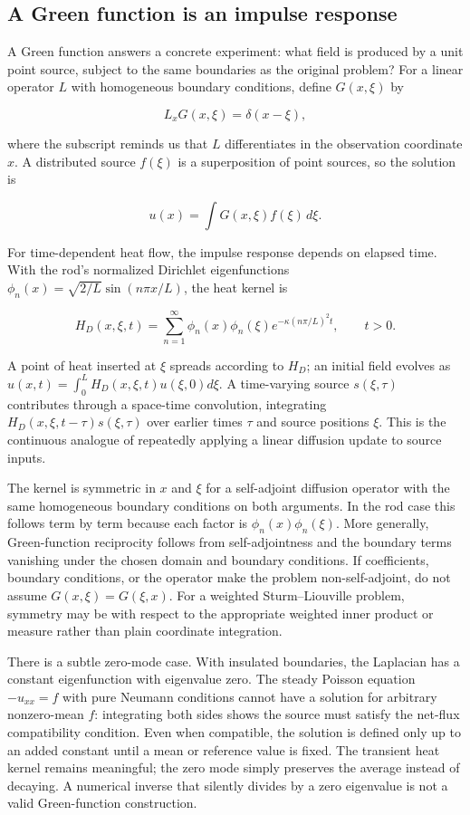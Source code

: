 \subsection{A Green function is an impulse response}\label{02-foundations-ii-ch025-a-green-function-is-an-impulse-response}

A Green function answers a concrete experiment: what field is produced by a unit point source, subject to the same boundaries as the original problem? For a linear operator \(L\) with homogeneous boundary conditions, define \(G(x,\xi)\) by

\[
L_xG(x,\xi)=\delta(x-\xi),
\]

where the subscript reminds us that \(L\) differentiates in the observation coordinate \(x\). A distributed source \(f(\xi)\) is a superposition of point sources, so the solution is

\[
u(x)=\int G(x,\xi)f(\xi)\,d\xi.
\]

For time-dependent heat flow, the impulse response depends on elapsed time. With the rod's normalized Dirichlet eigenfunctions \(\phi_n(x)=\sqrt{2/L}\sin(n\pi x/L)\), the heat kernel is

\[
H_D(x,\xi,t)=\sum_{n=1}^{\infty}\phi_n(x)\phi_n(\xi)e^{-\kappa(n\pi/L)^2t},\qquad t>0.
\]

A point of heat inserted at \(\xi\) spreads according to \(H_D\); an initial field evolves as \(u(x,t)=\int_0^LH_D(x,\xi,t)u(\xi,0)d\xi\). A time-varying source \(s(\xi,\tau)\) contributes through a space-time convolution, integrating \(H_D(x,\xi,t-\tau)s(\xi,\tau)\) over earlier times \(\tau\) and source positions \(\xi\). This is the continuous analogue of repeatedly applying a linear diffusion update to source inputs.

The kernel is symmetric in \(x\) and \(\xi\) for a self-adjoint diffusion operator with the same homogeneous boundary conditions on both arguments. In the rod case this follows term by term because each factor is \(\phi_n(x)\phi_n(\xi)\). More generally, Green-function reciprocity follows from self-adjointness and the boundary terms vanishing under the chosen domain and boundary conditions. If coefficients, boundary conditions, or the operator make the problem non-self-adjoint, do not assume \(G(x,\xi)=G(\xi,x)\). For a weighted Sturm--Liouville problem, symmetry may be with respect to the appropriate weighted inner product or measure rather than plain coordinate integration.

There is a subtle zero-mode case. With insulated boundaries, the Laplacian has a constant eigenfunction with eigenvalue zero. The steady Poisson equation \(-u_{xx}=f\) with pure Neumann conditions cannot have a solution for arbitrary nonzero-mean \(f\): integrating both sides shows the source must satisfy the net-flux compatibility condition. Even when compatible, the solution is defined only up to an added constant until a mean or reference value is fixed. The transient heat kernel remains meaningful; the zero mode simply preserves the average instead of decaying. A numerical inverse that silently divides by a zero eigenvalue is not a valid Green-function construction.

